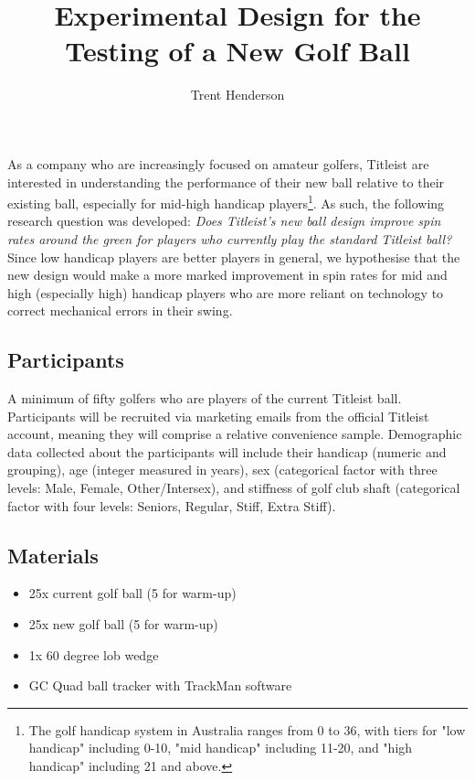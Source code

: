 \documentclass{article}
\begin{document}
\title{\vspace{-4cm}Experimental Design for the Testing of a New Golf Ball}
\author{Trent Henderson}
\date{}

\maketitle

As a company who are increasingly focused on amateur golfers, Titleist are interested in understanding the performance of their new ball relative to their existing ball, especially for mid-high handicap players\footnote{The golf handicap system in Australia ranges from 0 to 36, with tiers for "low handicap" including 0-10, "mid handicap" including 11-20, and "high handicap" including 21 and above.}. 
As such, the following research question was developed: \textit{Does Titleist's new ball design improve spin rates around the green for players who currently play the standard Titleist ball?} 
Since low handicap players are better players in general, we hypothesise that the new design would make a more marked improvement in spin rates for mid and high (especially high) handicap players who are more reliant on technology to correct mechanical errors in their swing.

\subsection*{Participants}

A minimum of fifty golfers who are players of the current Titleist ball. 
Participants will be recruited via marketing emails from the official Titleist account, meaning they will comprise a relative convenience sample. 
Demographic data collected about the participants will include their handicap (numeric and grouping), age (integer measured in years), sex (categorical factor with three levels: Male, Female, Other/Intersex), and stiffness of golf club shaft (categorical factor with four levels: Seniors, Regular, Stiff, Extra Stiff). 

\subsection*{Materials}

\begin{itemize}
    \item 25x current golf ball (5 for warm-up)
    \item 25x new golf ball (5 for warm-up)
    \item 1x 60 degree lob wedge
    \item GC Quad ball tracker with TrackMan software
\end{itemize}
\end{document}
